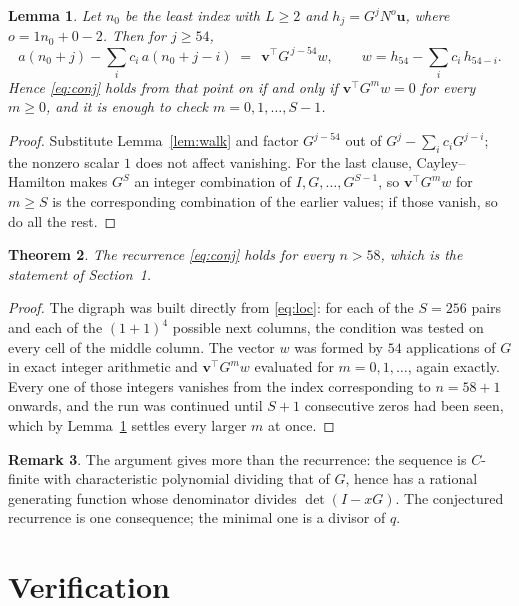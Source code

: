 \documentclass[11pt,a4paper]{article}
\theoremstyle{plain}
\newtheorem{theorem}{Theorem}
\newtheorem{lemma}[theorem]{Lemma}
\theoremstyle{definition}
\newtheorem{remark}[theorem]{Remark}
\begin{document}
\begin{lemma}\label{lem:crit}
Let $n_0$ be the least index with $L\ge2$ and $h_j=G^{j}N^{o}\mathbf{u}$, where
$o=1n_0+0-2$. Then for $j\ge54$,
\[
a(n_0+j)-\sum_i c_i\,a(n_0+j-i)\;=\;\,\mathbf{v}^{\!\top}G^{\,j-54}w,
\qquad w=h_{54}-\sum_i c_i\,h_{54-i} .
\]
Hence \eqref{eq:conj} holds from that point on if and only if
$\mathbf{v}^{\!\top}G^{m}w=0$ for every $m\ge0$, and it is enough to check
$m=0,1,\dots,S-1$.
\end{lemma}

\begin{proof}
Substitute Lemma~\ref{lem:walk} and factor $G^{j-54}$ out of
$G^{j}-\sum_ic_iG^{j-i}$; the nonzero scalar $1$ does not affect
vanishing. For the last clause, Cayley--Hamilton makes $G^{S}$ an integer combination of
$I,G,\dots,G^{S-1}$, so $\mathbf{v}^{\!\top}G^{m}w$ for $m\ge S$ is the corresponding
combination of the earlier values; if those vanish, so do all the rest.
\end{proof}

\begin{theorem}
The recurrence \eqref{eq:conj} holds for every $n>58$, which is the statement of
Section~1.
\end{theorem}

\begin{proof}
The digraph was built directly from \eqref{eq:loc}: for each of the $S=256$ pairs and each
of the $(1+1)^{4}$ possible next columns, the condition was tested on every cell of
the middle column. The vector $w$ was formed by $54$ applications of $G$ in exact integer
arithmetic and $\mathbf{v}^{\!\top}G^{m}w$ evaluated for $m=0,1,\dots$, again exactly.
Every one of those integers vanishes from the index corresponding to $n=58+1$ onwards,
and the run was continued until $S+1$ consecutive zeros had been seen, which by
Lemma~\ref{lem:crit} settles every larger $m$ at once.
\end{proof}

\begin{remark}
The argument gives more than the recurrence: the sequence is $C$-finite with characteristic
polynomial dividing that of $G$, hence has a rational generating function whose denominator
divides $\det(I-xG)$. The conjectured recurrence is one consequence; the minimal one is a
divisor of $q$.
\end{remark}

\section{Verification}
\end{document}

